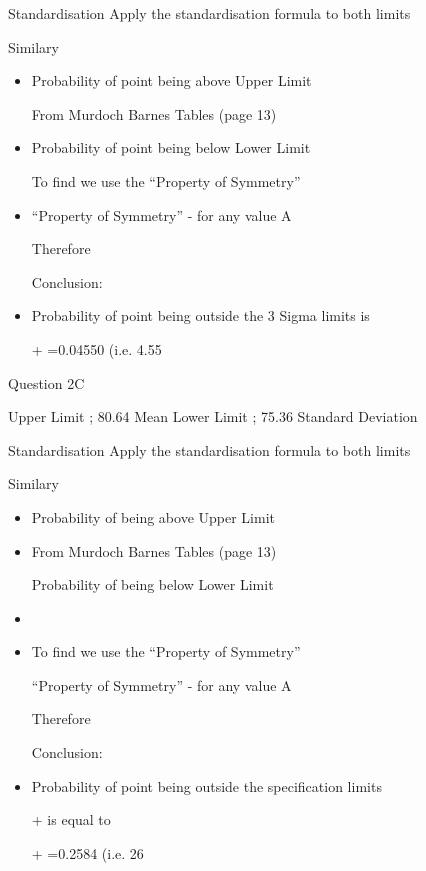 Standardisation
Apply the standardisation formula	 	to both limits


Similary


\begin{itemize}
\item Probability of point being above Upper Limit

From Murdoch Barnes Tables (page 13)  

\item Probability of point being below Lower Limit


To find   we use the “Property of Symmetry”

\item “Property of Symmetry” -   for any value A

Therefore 

Conclusion: 
\item Probability of point being outside the 3 Sigma limits is

+ =0.04550 	(i.e. 4.55%
\end{itemize}















Question 2C

Upper Limit ; 80.64		Mean		 	
Lower Limit ; 75.36		Standard Deviation	 

Standardisation
Apply the standardisation formula	 	to both limits


Similary



\begin{itemize}
\item Probability of being above Upper Limit

\item From Murdoch Barnes Tables (page 13)  

Probability of being below Lower Limit


\item \item To find   we use the “Property of Symmetry”

“Property of Symmetry” -   for any value A

Therefore 

Conclusion: 
\item Probability of point being outside the specification limits 

+ is equal to

+ =0.2584 	(i.e. 26%
\end{itemize}













